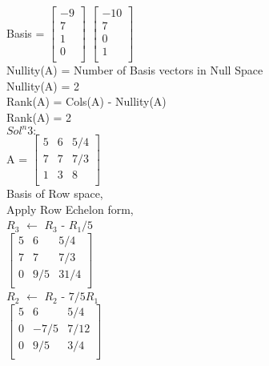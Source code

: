 \documentclass{article}
\begin{document}
     
Basis = $\begin{bmatrix}
    -9 \\
    7 \\
    1 \\
    0 \\
    \end{bmatrix}$   $\begin{bmatrix}
    -10 \\
    7 \\
    0 \\
    1 \\
     \end{bmatrix}$ \\

Nullity(A) = Number of Basis vectors in Null Space \\

Nullity(A) = 2\\

Rank(A) = Cols(A) - Nullity(A) \\

Rank(A) = 2 \\

$Sol^n 3:$ \\

A = $\begin{bmatrix}
    5 & 6 & 5/4\\
    7 & 7 & 7/3 \\
    1 & 3 & 8  \\
    \end{bmatrix}$ \\

Basis of Row space,\\

Apply Row Echelon form, \\

$R_3$ $\leftarrow$ $R_3$ - $R_1/5$\\

$\begin{bmatrix}
    5 & 6 & 5/4\\
    7 & 7 & 7/3 \\
    0 & 9/5 & 31/4  \\
    \end{bmatrix}$ \\

$R_2$ $\leftarrow$ $R_2$ - $7/5R_1$\\

$\begin{bmatrix}
    5 & 6 & 5/4\\
    0 & -7/5 & 7/12 \\
    0 & 9/5 & 3/4  \\
    \end{bmatrix}$ \\
    
\end{document}
